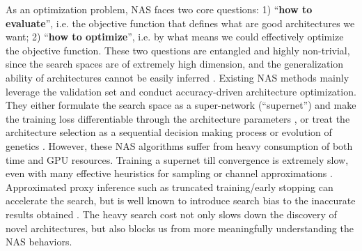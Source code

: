 \documentclass{article} \usepackage{iclr2021_conference,times}
\begin{document}
As an optimization problem, NAS faces two core questions: 1) ``\textbf{how to evaluate}'', i.e. the objective function that defines what are good architectures we want; 2) ``\textbf{how to optimize}'', i.e. by what means we could effectively optimize the objective function. 
These two questions are entangled and highly non-trivial, since the search spaces are of extremely high dimension, and the generalization ability of architectures cannot be easily inferred \citep{dong2020bench,dong2020nats}.
Existing NAS methods mainly leverage the validation set and conduct accuracy-driven architecture optimization. They either formulate the search space as a super-network (``supernet'') and make the training loss differentiable through the architecture parameters \citep{liu2018darts}, or treat the architecture selection as a sequential decision making process \citep{zoph2016neural} or evolution of genetics \citep{real2019regularized}.
However, these NAS algorithms suffer from heavy consumption of both time and GPU resources. Training a supernet till convergence is extremely slow, even with many effective heuristics for sampling or channel approximations \citep{dong2019searching,xu2019pc}. 
Approximated proxy inference such as truncated training/early stopping can accelerate the search, but is well known to introduce search bias to the inaccurate results obtained \citep{pham2018efficient,liang2019darts+,tan2020efficientdet}.
The heavy search cost not only slows down the discovery of novel architectures, but also blocks us from more meaningfully understanding the NAS behaviors.
\end{document}
